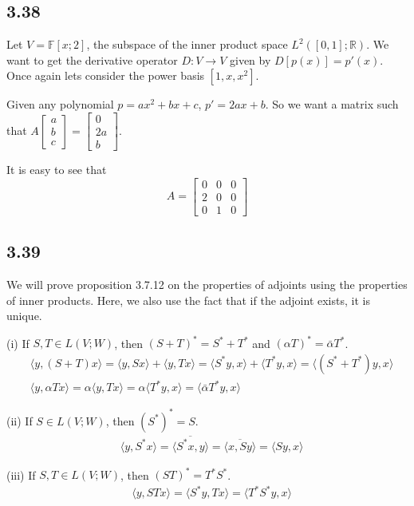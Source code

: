 \documentclass{article}
\newcommand{\inprod}[1]{\langle #1 \rangle}
\begin{document}
	\subsection*{3.38}
	Let $V = \mathbb{F}[x;2]$, the subspace of the inner product space $L^2([0,1];\mathbb{R})$. We want to get the derivative operator $D: V \to V$ given by $D[p(x)] = p'(x)$. Once again lets consider the power basis $[1,x,x^2]$. 
	
	Given any polynomial $p = ax^2 + bx + c$, $p' = 2ax + b$. So we want a matrix such that $A \begin{bmatrix} a \\ b \\ c \end{bmatrix} = \begin{bmatrix} 0 \\ 2a \\ b \end{bmatrix}$.
	
	It is easy to see that 
	\[ A = \begin{bmatrix} 0 & 0 & 0 \\ 2 & 0 & 0 \\ 0 & 1 & 0 \end{bmatrix}  \]
	
	\subsection*{3.39}
	We will prove proposition 3.7.12 on the properties of adjoints using the properties of inner products. Here, we also use the fact that if the adjoint exists, it is unique.
	
	(i) If $S,T \in L(V;W)$, then $(S+T)^* = S^* + T^*$ and $(\alpha T)^* = \bar{\alpha} T^*$. 
	\begin{align*}
	&\inprod{y ,(S+T)x} = \inprod{y, Sx} + \inprod{y, Tx} = \inprod{S^* y, x} + \inprod{T^* y, x} = \inprod{(S^* + T^* )y, x} \\
	&\inprod{y, \alpha T x} = \alpha \inprod{y, Tx} = \alpha \inprod{T^* y, x} = \inprod{\bar{\alpha} T^* y, x}
	\end{align*}
	
	(ii) If $ S \in L(V;W)$, then $(S^*)^* = S$.
	\begin{align*}
	&\inprod{y, S^* x} = \overline{\inprod{S^* x, y}} = \overline{\inprod{x, Sy}} = \inprod{Sy, x}
	\end{align*}
	
	(iii) If $S, T \in L(V;W)$, then $(ST)^* = T^* S^*$.
	\begin{align*}
	&\inprod{y, STx} = \inprod{S^*y, Tx} = \inprod{T^* S^*y, x}
	\end{align*}
	
\end{document}
